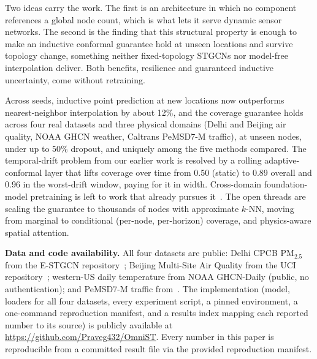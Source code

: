 \documentclass[journal]{IEEEtran}
\newcommand{\repourl}{https://github.com/Praveg432/OmniST}
\begin{document}
Two ideas carry the work. The first is an architecture in which no component references a global node
count, which is what lets it serve dynamic sensor networks. The second is the finding that this
structural property is enough to make an inductive conformal guarantee hold at unseen locations and
survive topology change, something neither fixed-topology STGCNs nor model-free interpolation deliver.
Both benefits, resilience and guaranteed inductive uncertainty, come without retraining.

Across seeds, inductive point prediction at new locations now outperforms nearest-neighbor
interpolation by about 12\%, and the coverage guarantee holds across four real datasets and three
physical domains (Delhi and Beijing air quality, NOAA GHCN weather, Caltrans PeMSD7-M traffic), at
unseen nodes, under up to 50\% dropout, and uniquely among the five methods compared. The
temporal-drift problem from our earlier work is resolved by a rolling adaptive-conformal layer that
lifts coverage over time from 0.50 (static) to 0.89 overall and 0.96 in the worst-drift window, paying
for it in width. Cross-domain foundation-model pretraining is left to work that already pursues
it~\cite{dambast2026}. The open threads are scaling the guarantee to thousands of nodes with
approximate $k$-NN, moving from marginal to conditional (per-node, per-horizon) coverage, and
physics-aware spatial attention.

\textbf{Data and code availability.} All four datasets are public: Delhi CPCB PM$_{2.5}$ from the
E-STGCN repository~\cite{panja2026estgcn}; Beijing Multi-Site Air Quality from the UCI
repository~\cite{zhang2017beijingair}; western-US daily temperature from NOAA GHCN-Daily (public,
no authentication); and PeMSD7-M traffic from~\cite{yu2018stgcn}. The implementation (model, loaders
for all four datasets, every experiment script, a pinned environment, a one-command reproduction
manifest, and a results index mapping each reported number to its source) is publicly available at
\url{\repourl}. Every number in this paper is reproducible from a committed result file via the
provided reproduction manifest.



\end{document}
